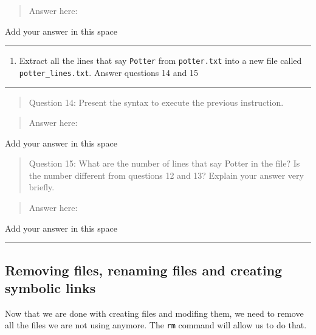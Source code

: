 \documentclass[
]{book}
\providecommand{\tightlist}{%
  \setlength{\itemsep}{0pt}\setlength{\parskip}{0pt}}
\begin{document}
\begin{quote}
Answer here:
\end{quote}

{Add your answer in this space}

\begin{center}\rule{0.5\linewidth}{0.5pt}\end{center}

\begin{enumerate}
\def\labelenumi{\arabic{enumi}.}
\setcounter{enumi}{3}
\tightlist
\item
  Extract all the lines that say \texttt{Potter} from \texttt{potter.txt} into a new file called \texttt{potter\_lines.txt}. Answer questions 14 and 15
\end{enumerate}

\begin{center}\rule{0.5\linewidth}{0.5pt}\end{center}

\begin{quote}
Question 14: Present the syntax to execute the previous instruction.
\end{quote}

\begin{quote}
Answer here:
\end{quote}

{Add your answer in this space}

\begin{quote}
Question 15: What are the number of lines that say Potter in the file? Is the number different from questions 12 and 13? Explain your answer very briefly.
\end{quote}

\begin{quote}
Answer here:
\end{quote}

{Add your answer in this space}

\begin{center}\rule{0.5\linewidth}{0.5pt}\end{center}

\hypertarget{removing-files-renaming-files-and-creating-symbolic-links}{%
\subsection{Removing files, renaming files and creating symbolic links}\label{removing-files-renaming-files-and-creating-symbolic-links}}

Now that we are done with creating files and modifing them, we need to remove all the files we are not using anymore. The \texttt{rm} command will allow us to do that.
\end{document}
